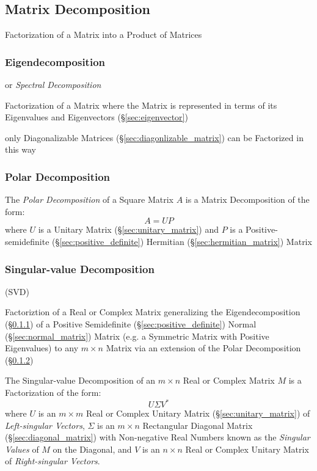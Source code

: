 \subsection{Matrix Decomposition}\label{sec:matrix_decomposition}

Factorization of a Matrix into a Product of Matrices



\subsubsection{Eigendecomposition}\label{sec:eigendecomposition}

or \emph{Spectral Decomposition}

Factorization of a Matrix where the Matrix is represented in terms of its
Eigenvalues and Eigenvectors (\S\ref{sec:eigenvector})

only Diagonalizable Matrices (\S\ref{sec:diagonlizable_matrix}) can be
Factorized in this way



\subsubsection{Polar Decomposition}\label{sec:polar_decomposition}

The \emph{Polar Decomposition} of a Square Matrix $A$ is a Matrix Decomposition
of the form:
\[
  A = U P
\]
where $U$ is a Unitary Matrix (\S\ref{sec:unitary_matrix}) and $P$ is a
Positive-semidefinite (\S\ref{sec:positive_definite}) Hermitian
(\S\ref{sec:hermitian_matrix}) Matrix



\subsubsection{Singular-value Decomposition}\label{sec:svd}

(SVD)

Factoriztion of a Real or Complex Matrix generalizing the Eigendecomposition
(\S\ref{sec:eigendecomposition}) of a Positive Semidefinite
(\S\ref{sec:positive_definite}) Normal (\S\ref{sec:normal_matrix}) Matrix (e.g.
a Symmetric Matrix with Positive Eigenvalues) to any $m \times n$ Matrix via an
extension of the Polar Decomposition (\S\ref{sec:polar_decomposition})

The Singular-value Decomposition of an $m \times n$ Real or Complex Matrix $M$
is a Factorization of the form:
\[
  U \Sigma V^*
\]
where $U$ is an $m \times m$ Real or Complex Unitary Matrix
(\S\ref{sec:unitary_matrix}) of \emph{Left-singular Vectors}, $\Sigma$ is an $m
\times n$ Rectangular Diagonal Matrix (\S\ref{sec:diagonal_matrix}) with
Non-negative Real Numbers known as the \emph{Singular Values} of $M$ on the
Diagonal, and $V$ is an $n \times n$ Real or Complex Unitary Matrix of
\emph{Right-singular Vectors}.



